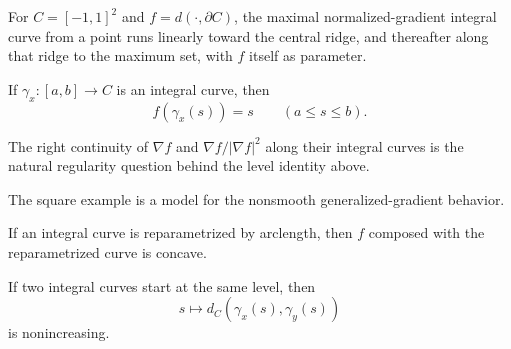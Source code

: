 \begin{example}
\label{ex:chow-iii-h44-square-integral-curves}
For $C=[-1,1]^2$ and $f=d(\cdot,\partial C)$, the maximal normalized-gradient
integral curve from a point runs linearly toward the central ridge, and thereafter
along that ridge to the maximum set, with $f$ itself as parameter.
\end{example}

\begin{lemma}
\label{lem:chow-iii-h45-integral-curve-level}
If $\gamma_x:[a,b]\to C$ is an integral curve, then
\[
f(\gamma_x(s))=s\qquad(a\le s\le b).
\]
\end{lemma}

\begin{remark}
\label{rem:chow-iii-h46-right-continuity-problem}
The right continuity of $\nabla f$ and $\nabla f/|\nabla f|^2$ along their integral curves
is the natural regularity question behind the level identity above.
\end{remark}

\begin{remark}
\label{rem:chow-iii-h47-model-example}
The square example is a model for the nonsmooth generalized-gradient behavior.
\end{remark}

\begin{lemma}
\label{lem:chow-iii-h48-integral-curve-concavity}
If an integral curve is reparametrized by arclength, then $f$ composed with the
reparametrized curve is concave.
\end{lemma}

\begin{lemma}
\label{lem:chow-iii-h49-integral-curves-distance}
If two integral curves start at the same level, then
\[
s\longmapsto d_C(\gamma_x(s),\gamma_y(s))
\]
is nonincreasing.
\end{lemma}

